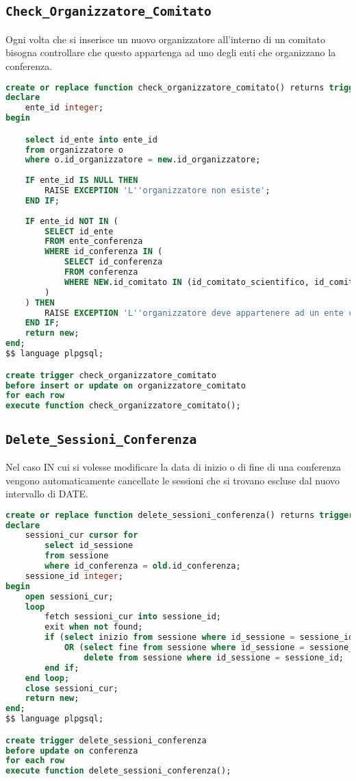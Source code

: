 \subsection{\texttt{Check\_Organizzatore\_Comitato}}
Ogni volta che si inserisce un nuovo organizzatore all'interno di un comitato bisogna controllare che questo appartenga ad uno degli enti che organizzano la conferenza.
\begin{lstlisting}[language=SQL, style=mystyle, caption={\texttt{Check\_organizzatori\_comitato}}]
create or replace function check_organizzatore_comitato() returns trigger as $$
declare
    ente_id integer;
begin

    select id_ente into ente_id
    from organizzatore o
    where o.id_organizzatore = new.id_organizzatore;
    
    IF ente_id IS NULL THEN
        RAISE EXCEPTION 'L''organizzatore non esiste';
    END IF;
    
    IF ente_id NOT IN (
        SELECT id_ente
        FROM ente_conferenza
        WHERE id_conferenza IN (
            SELECT id_conferenza
            FROM conferenza
            WHERE NEW.id_comitato IN (id_comitato_scientifico, id_comitato_locale)
        )
    ) THEN
        RAISE EXCEPTION 'L''organizzatore deve appartenere ad un ente che ha organizzato la conferenza';
    END IF;
    return new;
end;
$$ language plpgsql;

create trigger check_organizzatore_comitato
before insert or update on organizzatore_comitato
for each row
execute function check_organizzatore_comitato();
\end{lstlisting}
\subsection{\texttt{Delete\_Sessioni\_Conferenza}}
Nel caso IN cui si volesse modificare la data di inizio o di fine di una conferenza vengono automaticamente cancellate le sessioni che si trovano escluse dal nuovo intervallo di DATE.
\begin{lstlisting}[language=SQL, style=mystyle, caption={\texttt{DELETE\_sessioni\_conferenza}}]
create or replace function delete_sessioni_conferenza() returns trigger as $$
declare
    sessioni_cur cursor for 
    	select id_sessione 
    	from sessione 
    	where id_conferenza = old.id_conferenza;
    sessione_id integer;
begin
    open sessioni_cur;
    loop
        fetch sessioni_cur into sessione_id;
        exit when not found;
        if (select inizio from sessione where id_sessione = sessione_id) < new.inizio 
        	OR (select fine from sessione where id_sessione = sessione_id) > new.fine then
            	delete from sessione where id_sessione = sessione_id;
        end if;
    end loop;
    close sessioni_cur;
    return new;
end;
$$ language plpgsql;

create trigger delete_sessioni_conferenza
before update on conferenza
for each row
execute function delete_sessioni_conferenza();
\end{lstlisting}
